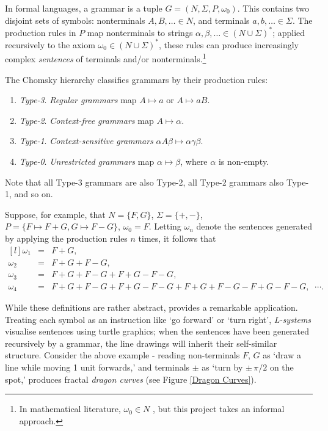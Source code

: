 \documentclass[a4paper, 11pt]{article}
\begin{document}
\begin{flushleft}
\newpage\noindent
In formal languages, a grammar is a tuple $G = (N,\Sigma,P,\omega_0)$. This contains two disjoint sets of symbols: nonterminals $A, B, \dots \in N$, and terminals $a, b, \dots \in \Sigma$. The production rules in $P$ map nonterminals to strings $\alpha, \beta, \dots \in (N\cup\Sigma)^*$; applied recursively to the axiom $\omega_0 \in (N\cup\Sigma)^*$, these rules can produce increasingly complex \textit{sentences} of terminals and/or nonterminals.\footnote{In mathematical literature, $
\omega_0 \in N$ \citep*{hopcroftFormalLanguages}, but this project takes an informal approach.}

\vspace{5pt}\noindent
The Chomsky hierarchy \citep{chomskyHierarchy} %
classifies grammars by their production rules:
\begin{enumerate}[label=,itemsep=0em]
\item \textit{Type-3}. \textit{Regular grammars} map $A \mapsto a$ or $A \mapsto aB$.
\item \textit{Type-2}. \textit{Context-free grammars} map $A \mapsto \alpha$.
\item \textit{Type-1}. \textit{Context-sensitive grammars} $\alpha A\beta \mapsto \alpha\gamma\beta$.
\item \textit{Type-0}. \textit{Unrestricted grammars} map $\alpha \mapsto \beta$, where $\alpha$ is non-empty.
\end{enumerate}
Note that all Type-3 grammars are also Type-2, all Type-2 grammars also Type-1, and so on.

\vspace{5pt}\noindent
Suppose, for example, that $N = \{F, G\}$, $\Sigma = \{+, -\}$, $P = \{F \mapsto F+G, G \mapsto F-G\}$, $\omega_0 = F$.
Letting $\omega_n$ denote the sentences generated by applying the production rules $n$ times, it follows that
$$\begin{matrix*}[l]
\omega_1 &= &F+G, \\
\omega_2 &= &F+G+F-G, \\
\omega_3 &= &F+G+F-G+F+G-F-G, \\
\omega_4 &= &F+G+F-G+F+G-F-G+F+G+F-G-F+G-F-G, \;\; \cdots.
\end{matrix*}$$

\vspace{5pt}\noindent
While these definitions are rather abstract, \citet{lindenmayerLSystems} provides a remarkable application. Treating each symbol as an instruction like `go forward' or `turn right', \textit{L-systems} visualise sentences using turtle graphics; when the sentences have been generated recursively by a grammar, the line drawings will inherit their self-similar structure. Consider the above example - reading non-terminals $F$, $G$ as `draw a line while moving 1 unit forwards,' and terminals $\pm$ as `turn by $\pm\, \pi/2$ on the spot,' produces fractal \textit{dragon curves} (see Figure \ref{Dragon Curves}).


\end{flushleft}
\end{document}
